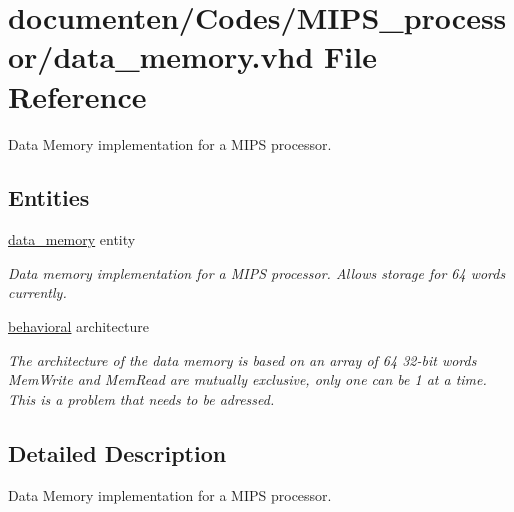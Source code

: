 \hypertarget{data__memory_8vhd}{\section{documenten/\-Codes/\-M\-I\-P\-S\-\_\-processor/data\-\_\-memory.vhd File Reference}
\label{data__memory_8vhd}
}


Data Memory implementation for a M\-I\-P\-S processor.  


\subsection*{Entities}
\begin{DoxyCompactItemize}
\item 
\hyperlink{classdata__memory}{data\-\_\-memory} entity
\begin{DoxyCompactList}\small\item\em Data memory implementation for a M\-I\-P\-S processor. Allows storage for 64 words currently. \end{DoxyCompactList}\item 
\hyperlink{classdata__memory_1_1behavioral}{behavioral} architecture
\begin{DoxyCompactList}\small\item\em The architecture of the data memory is based on an array of 64 32-\/bit words  Mem\-Write and Mem\-Read are mutually exclusive, only one can be 1 at a time. This is a problem that needs to be adressed. \end{DoxyCompactList}\end{DoxyCompactItemize}


\subsection{Detailed Description}
Data Memory implementation for a M\-I\-P\-S processor. 
